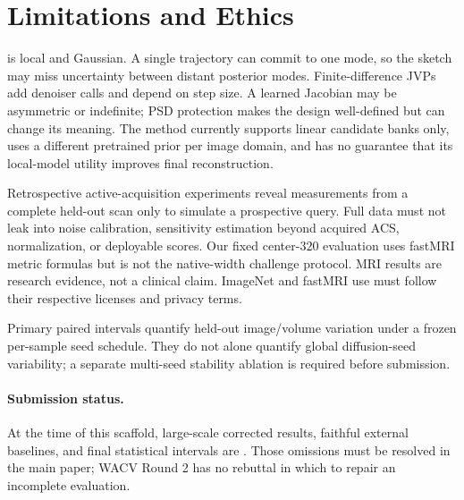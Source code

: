 \section{Limitations and Ethics}

\method{} is local and Gaussian.  A single trajectory can commit to one mode,
so the sketch may miss uncertainty between distant posterior modes.
Finite-difference JVPs add denoiser calls and depend on step size.  A learned
Jacobian may be asymmetric or indefinite; PSD protection makes the design
well-defined but can change its meaning.  The method currently supports
linear candidate banks only, uses a different pretrained prior per image
domain, and has no guarantee that its local-model utility improves final
reconstruction.

Retrospective active-acquisition experiments reveal measurements from a
complete held-out scan only to simulate a prospective query.  Full data must
not leak into noise calibration, sensitivity estimation beyond acquired ACS,
normalization, or deployable scores.  Our fixed center-$320$ evaluation uses
fastMRI metric formulas but is not the native-width challenge protocol.  MRI
results are research evidence, not a clinical claim.  ImageNet and fastMRI
use must follow their respective licenses and privacy terms.

Primary paired intervals quantify held-out image/volume variation under a
frozen per-sample seed schedule.  They do not alone quantify global
diffusion-seed variability; a separate multi-seed stability ablation is
required before submission.

\paragraph{Submission status.}
At the time of this scaffold, large-scale corrected results, faithful external
baselines, and final statistical intervals are \pending.  Those omissions
must be resolved in the main paper; WACV Round 2 has no rebuttal in which to
repair an incomplete evaluation.
